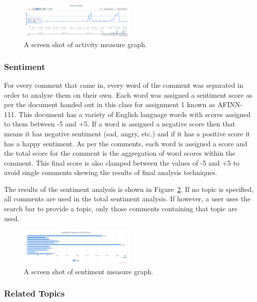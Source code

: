 \documentclass[conference]{IEEEtran}
\begin{document}
\begin{figure}[h]
\centering
\includegraphics[width=0.5\textwidth]{images/activity.png}
\caption{A screen shot of activity measure graph.\label{fig:activity}}
\end{figure}

\subsubsection{Sentiment}

For every comment that came in, every word of the comment was separated in order to analyze them on their own.
Each word was assigned a sentiment score as per the document handed out in this class for assignment 1
known as AFINN-111. This document has a variety of English language words with scores assigned to them
between -5 and +5. If a word is assigned a negative score then that means it has negative sentiment (sad, 
angry, etc.) and if it has a positive score it has a happy sentiment. As per the comments, each word is assigned
a score and the total score for the comment is the aggregation of word scores within the comment. This final
score is also clamped between the values of -5 and +5 to avoid single comments skewing the results of
final analysis techniques. 

The results of the sentiment analysis is shown in Figure~\ref{fig:sent}. If no topic is specified, all comments
are used in the total sentiment analysis. If however, a user uses the search bar to provide a topic, only those
comments containing that topic are used.

\begin{figure}[h]
\centering
\includegraphics[width=0.5\textwidth]{images/sent.png}
\caption{A screen shot of sentiment measure graph.\label{fig:sent}}
\end{figure}

\subsubsection{Related Topics}
\end{document}
